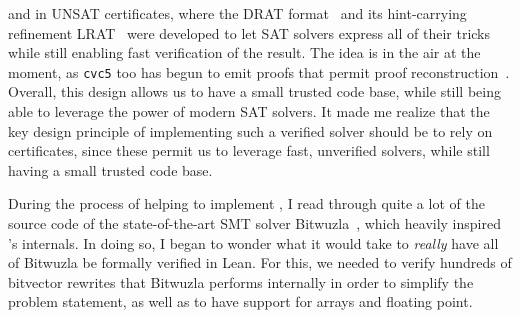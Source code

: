 and in UNSAT certificates, where the DRAT format~\citep{heule2016drat} and its
hint-carrying refinement LRAT~\citep{cruz2017efficient} were developed to
let SAT solvers express all of their tricks while still enabling fast verification of the result.
The idea is in the air at the moment, as \texttt{cvc5} too has begun to emit proofs that permit proof reconstruction~\citep{mohamed2025lean}.
Overall, this design allows us to have a small trusted code base, while still being able to leverage the power of modern SAT solvers.
It made me realize that the key design principle of implementing such a verified solver should be to rely on certificates,
since these permit us to leverage fast, unverified solvers, while still having a small trusted code base.

During the process of helping to implement \bvdecide{},
I read through quite a lot of the source code of the state-of-the-art SMT solver Bitwuzla~\citep{niemetz2023bitwuzla},
which heavily inspired \bvdecide{}'s internals. In doing so, I began to wonder what it would take to \emph{really}
have all of Bitwuzla be formally verified in Lean.
For this, we needed to verify hundreds of bitvector rewrites that Bitwuzla performs internally in order to simplify the problem statement,
as well as to have support for arrays and floating point.

